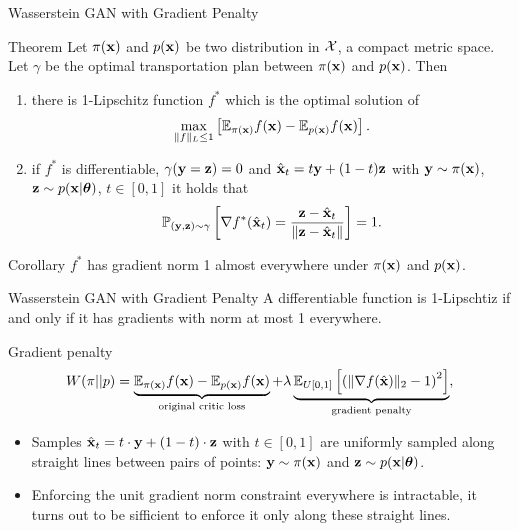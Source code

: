 \begin{frame}{Wasserstein GAN with Gradient Penalty}
	\begin{block}{Theorem}
		Let $\pi(\mathbf{x})$ and $p(\mathbf{x})$ be two distribution in $\mathcal{X}$, a compact metric space. Let $\gamma$ be the optimal transportation plan between $\pi(\mathbf{x})$ and $p(\mathbf{x})$. Then
		\begin{enumerate}
			\item there is 1-Lipschitz function $f^*$ which is the optimal solution of 
			\[
				\max_{\| f \|_L \leq 1} \left[ \mathbb{E}_{\pi(\mathbf{x})} f(\mathbf{x})  - \mathbb{E}_{p(\mathbf{x})} f(\mathbf{x})\right].
			\]
			\item if $f^*$ is differentiable, $\gamma(\mathbf{y} = \mathbf{z}) = 0$ and $\hat{\mathbf{x}}_t = t \mathbf{y} + (1 - t) \mathbf{z}$ with $\mathbf{y} \sim \pi(\mathbf{x})$, $\mathbf{z} \sim p(\mathbf{x} | \boldsymbol{\theta})$, $t \in [0, 1]$ it holds that
			\[
				\mathbb{P}_{(\mathbf{y}, \mathbf{z}) \sim \gamma} \left[ \nabla f^*(\hat{\mathbf{x}}_t) = \frac{\mathbf{z} - \hat{\mathbf{x}}_t}{\| \mathbf{z} - \hat{\mathbf{x}}_t \|} \right] = 1.
			\]
		\end{enumerate}
	\end{block}
	\vspace{-0.5cm}
	\begin{block}{Corollary}
		$f^*$ has gradient norm 1 almost everywhere under $\pi(\mathbf{x})$ and $p(\mathbf{x})$.
	\end{block}

\end{frame}
\begin{frame}{Wasserstein GAN with Gradient Penalty}
	A differentiable function is 1-Lipschtiz if and only if it has gradients with norm at most 1 everywhere.
	\begin{block}{Gradient penalty}
		\vspace{-0.3cm}
		\[
			W(\pi || p) = \underbrace{\mathbb{E}_{\pi(\mathbf{x})} f(\mathbf{x})  - \mathbb{E}_{p(\mathbf{x})} f(\mathbf{x})}_{\text{original critic loss}} + \lambda \underbrace{\mathbb{E}_{U[0, 1]} \left[ \left( \| \nabla f(\hat{\mathbf{x}}) \|_2 - 1 \right) ^ 2\right]}_{\text{gradient penalty}},
		\]
		\vspace{-0.3cm}
	\end{block}
	\begin{itemize}
		\item Samples $\hat{\mathbf{x}}_t = t \cdot \mathbf{y} + (1 - t) \cdot \mathbf{z}$ with $t \in [0, 1]$ are uniformly sampled along straight lines between pairs of points: $\mathbf{y} \sim \pi(\mathbf{x})$ and $\mathbf{z} \sim p(\mathbf{x} | \boldsymbol{\theta})$.
		\item Enforcing the unit gradient norm constraint everywhere is intractable, it turns out to be sifficient to enforce it only along these straight lines.
	\end{itemize}

\end{frame}
